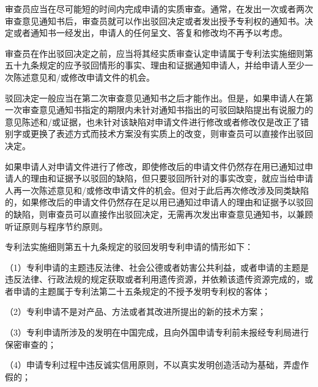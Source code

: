 审查员应当在尽可能短的时间内完成申请的实质审查。通常，在发出一次或者两次审查意见通知书后，审查员就可以作出驳回决定或者发出授予专利权的通知书。决定或者通知书一经发出，申请人的任何呈文、答复和修改均不再予以考虑。

审查员在作出驳回决定之前，应当将其经实质审查认定申请属于专利法实施细则第五十九条规定的应予驳回情形的事实、理由和证据通知申请人，并给申请人至少一次陈述意见和/或修改申请文件的机会。

驳回决定一般应当在第二次审查意见通知书之后才能作出。但是，如果申请人在第一次审查意见通知书指定的期限内未针对通知书指出的可驳回缺陷提出有说服力的意见陈述和/或证据，也未针对该缺陷对申请文件进行修改或者修改仅是改正了错别字或更换了表述方式而技术方案没有实质上的改变，则审查员可以直接作出驳回决定。

如果申请人对申请文件进行了修改，即使修改后的申请文件仍然存在用已通知过申请人的理由和证据予以驳回的缺陷，但只要驳回所针对的事实改变，就应当给申请人再一次陈述意见和/或修改申请文件的机会。但对于此后再次修改涉及同类缺陷的，如果修改后的申请文件仍然存在足以用已通知过申请人的理由和证据予以驳回的缺陷，则审查员可以直接作出驳回决定，无需再次发出审查意见通知书，以兼顾听证原则与程序节约原则。

专利法实施细则第五十九条规定的驳回发明专利申请的情形如下：

{\setlength{\parindent}{17.1bp}（1）专利申请的主题违反法律、社会公德或者妨害公共利益，或者申请的主题是违反法律、行政法规的规定获取或者利用遗传资源，并依赖该遗传资源完成的，或者申请的主题属于专利法第二十五条规定的不授予发明专利权的客体；\par}

{\setlength{\parindent}{17.1bp}（2）专利申请不是对产品、方法或者其改进所提出的新的技术方案；\par}

{\setlength{\parindent}{17.1bp}（3）专利申请所涉及的发明在中国完成，且向外国申请专利前未报经专利局进行保密审查的；\par}

{\setlength{\parindent}{17.1bp}（4）申请专利过程中违反诚实信用原则，不以真实发明创造活动为基础，弄虚作假的；\par}

